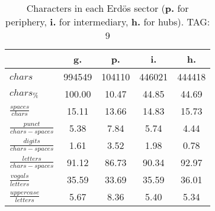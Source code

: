 \begin{table}[h!]
\begin{center}
\begin{tabular}{| l || c | c | c | c |}\hline
 & {\bf g.} & {\bf p.} & {\bf i.} & {\bf h.} \\\hline\hline
$chars$ & 994549  & 104110  & 446021  & 444418 \\
$chars_{\%}$ & 100.00  & 10.47  & 44.85  & 44.69 \\\hline
$\frac{spaces}{chars}$ & 15.11  & 13.66  & 14.83  & 15.73 \\
$\frac{punct}{chars-spaces}$ & 5.38  & 7.84  & 5.74  & 4.44 \\
$\frac{digits}{chars-spaces}$ & 1.61  & 3.52  & 1.98  & 0.78 \\\hline
$\frac{letters}{chars-spaces}$ & 91.12  & 86.73  & 90.34  & 92.97 \\
$\frac{vogals}{letters}$ & 35.59  & 33.69  & 35.59  & 36.01 \\
$\frac{uppercase}{letters}$ & 5.67  & 8.36  & 5.40  & 5.34 \\\hline
\end{tabular}
\caption{Characters in each Erd\"os sector ({{\bf p.}} for periphery, {{\bf i.}} for intermediary, 
    {{\bf h.}} for hubs). TAG: 9}
\end{center}
\end{table}